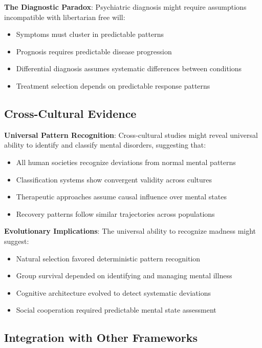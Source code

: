 \documentclass[12pt]{article}
\begin{document}
\textbf{The Diagnostic Paradox}: Psychiatric diagnosis might require assumptions incompatible with libertarian free will:
\begin{itemize}
\item Symptoms must cluster in predictable patterns
\item Prognosis requires predictable disease progression
\item Differential diagnosis assumes systematic differences between conditions
\item Treatment selection depends on predictable response patterns
\end{itemize}

\subsection{Cross-Cultural Evidence}

\textbf{Universal Pattern Recognition}: Cross-cultural studies might reveal universal ability to identify and classify mental disorders, suggesting that:
\begin{itemize}
\item All human societies recognize deviations from normal mental patterns
\item Classification systems show convergent validity across cultures
\item Therapeutic approaches assume causal influence over mental states
\item Recovery patterns follow similar trajectories across populations
\end{itemize}

\textbf{Evolutionary Implications}: The universal ability to recognize madness might suggest:
\begin{itemize}
\item Natural selection favored deterministic pattern recognition
\item Group survival depended on identifying and managing mental illness
\item Cognitive architecture evolved to detect systematic deviations
\item Social cooperation required predictable mental state assessment
\end{itemize}

\subsection{Integration with Other Frameworks}
\end{document}
